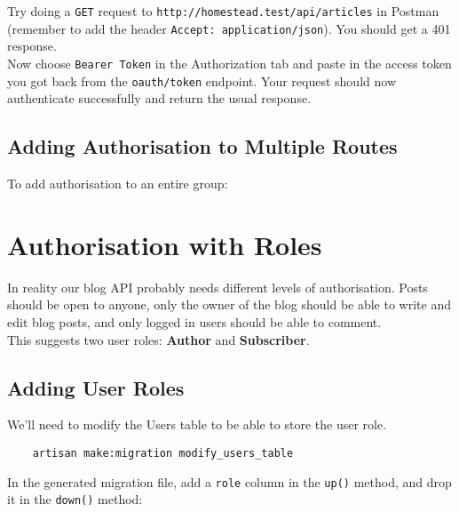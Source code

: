 
Try doing a \texttt{GET} request to \texttt{http://homestead.test/api/articles} in Postman (remember to add the header \texttt{Accept: application/json}). You should get a 401 response.
\\

Now choose \texttt{Bearer Token} in the Authorization tab and paste in the access token you got back from the \texttt{oauth/token} endpoint. Your request should now authenticate successfully and return the usual response.

\subsection{Adding Authorisation to Multiple Routes}

To add authorisation to an entire group:




\section{Authorisation with Roles}

In reality our blog API probably needs different levels of authorisation. Posts should be open to anyone, only the owner of the blog should be able to write and edit blog posts, and only logged in users should be able to comment.
\\

This suggests two user roles: \textbf{Author} and \textbf{Subscriber}.


\subsection{Adding User Roles}

We'll need to modify the Users table to be able to store the user role.

\begin{verbatim}
    artisan make:migration modify_users_table
\end{verbatim}

In the generated migration file, add a \texttt{role} column in the \texttt{up()} method, and drop it in the \texttt{down()} method:


